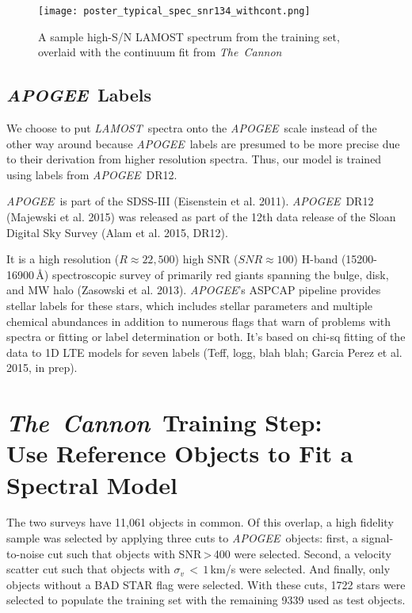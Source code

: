 \documentclass[12pt, preprint]{aastex}
\newcommand{\tc}{\textsl{The~Cannon}}
\newcommand{\apogee}{\textsl{APOGEE}}
\newcommand{\lamost}{\textsl{LAMOST}}
\begin{document}
\begin{figure}[!htbp]
\centering
\texttt{[image: poster\_typical\_spec\_snr134\_withcont.png]}
\caption{A sample high-S/N LAMOST spectrum from the training set, 
overlaid with the continuum fit from \tc}
\label{fig:sample_spec}
\end{figure}

\subsection{\apogee\ Labels}

We choose to put \lamost\ spectra onto the \apogee\ scale instead of the
other way around because \apogee\ labels are presumed to be more precise
due to their derivation from higher resolution spectra. Thus, our model is
trained using labels from \apogee\ DR12. 

\apogee\ is part of the SDSS-III (Eisenstein et al. 2011). 
\apogee\ DR12 (Majewski et al. 2015) was released as part of the 12th data release of the Sloan
Digital Sky Survey (Alam et al. 2015, DR12). 

It is a high resolution
($R\approx22,500$) high SNR ($SNR\approx100$) H-band (15200-16900\,$\mbox{\AA}$) spectroscopic
survey of primarily red giants spanning the bulge, disk, and MW halo 
(Zasowski et al. 2013). \apogee's ASPCAP pipeline provides stellar labels for
these stars, which includes stellar parameters and multiple chemical 
abundances in addition to numerous flags that warn of problems with spectra
or fitting or label determination or both. It's based on chi-sq fitting of
the data to 1D LTE models for seven labels (Teff, logg, blah blah; Garcia 
Perez et al. 2015, in prep). 

\section{\tc\ Training Step: \\ Use Reference Objects to Fit a Spectral Model}

The two surveys have 11,061 objects in common. Of this overlap, a high 
fidelity sample was selected by applying three cuts to \apogee\ objects: 
first, a signal-to-noise cut such that objects with SNR\,\textgreater\,400 
were selected. Second, a velocity scatter cut such that objects with 
$\sigma_v\, < \,1$\,km/s were selected. And finally, only objects
without a BAD STAR flag were selected. With these cuts, 1722 stars were
selected to populate the training set with the remaining 9339 used as test
objects. 
\end{document}
